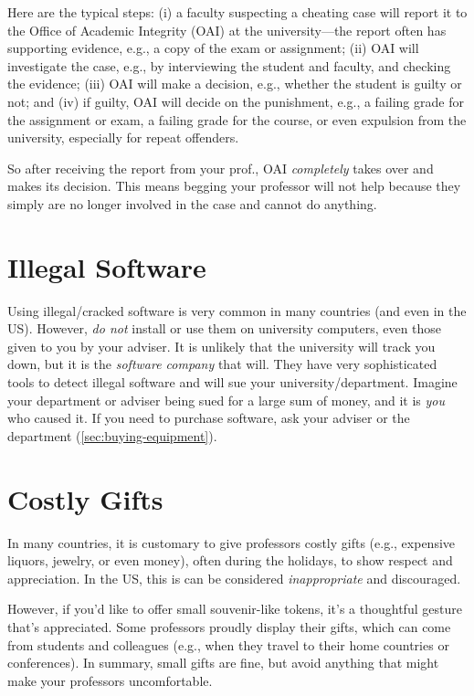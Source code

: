\documentclass[oneside,11pt,dvipsnames]{book}
\begin{document}
Here are the typical steps: (i) a faculty suspecting a cheating case will report it to the Office of Academic Integrity (OAI) at the university---the report often has supporting evidence, e.g., a copy of the exam or assignment; (ii) OAI will investigate the case, e.g., by interviewing the student and faculty, and checking the evidence; (iii) OAI will make a decision, e.g., whether the student is guilty or not; and (iv) if guilty, OAI will decide on the punishment, e.g., a failing grade for the assignment or exam, a failing grade for the course, or even expulsion from the university, especially for repeat offenders.

So after receiving the report from your prof., OAI \emph{completely} takes over and makes its decision. This means begging your professor will not help because they simply are no longer involved in the case and cannot do anything.

\section{Illegal Software}\label{sec:illegal-software}
 Using illegal/cracked software is very common in many countries (and even in the US). However, \emph{do not} install or use them on university computers, even those given to you by your adviser.  It is unlikely that the university will track you down, but it is the \emph{software company} that will.  They have very sophisticated tools to detect illegal software and will sue your university/department.  Imagine your department or adviser being sued for a large sum of money, and it is \emph{you} who caused it.  If you need to purchase software,  ask your adviser or the department (\autoref{sec:buying-equipment}).


\section{Costly Gifts}\label{sec:gifts} In many countries, it is customary to give professors costly gifts (e.g., expensive liquors, jewelry, or even money), often during the holidays, to show respect and appreciation.  In the US, this is can be considered \emph{inappropriate} and discouraged. 

However, if you'd like to offer small souvenir-like tokens, it's a thoughtful gesture that's appreciated. Some professors proudly display their gifts, which can come from students and colleagues (e.g., when they travel to their home countries or conferences). In summary, small gifts are fine, but avoid anything that might make your professors uncomfortable.
\end{document}
